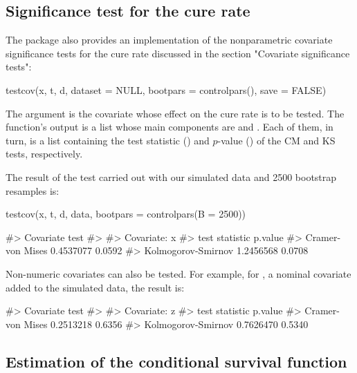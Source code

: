 \subsection{Significance test for the cure rate} \label{sec:sig_test}

The  package also provides an implementation of the nonparametric covariate significance tests for the cure rate discussed in the section "Covariate significance tests":

\begin{example}
testcov(x, t, d, dataset = NULL, bootpars = controlpars(), save = FALSE)
\end{example}

The  argument is the covariate whose effect on the cure rate is to be tested. The function's output is a list whose main components are  and . Each of them, in turn, is a list containing the test statistic () and $p$-value () of the CM and KS tests, respectively.

The result of the test carried out with our simulated data and 2500 bootstrap resamples is:

\begin{example}
testcov(x, t, d, data, bootpars = controlpars(B = 2500))
\end{example}
\begin{example}
#> Covariate test 
#>
#> Covariate:  x 
#>               test statistic p.value
#>   Cramer-von Mises 0.4537077  0.0592
#> Kolmogorov-Smirnov 1.2456568  0.0708
\end{example}

Non-numeric covariates can also be tested. For example, for , a nominal covariate added to the simulated data, the result is:

\begin{example}
#> Covariate test 
#>
#> Covariate:  z 
#>               test statistic p.value
#>   Cramer-von Mises 0.2513218  0.6356
#> Kolmogorov-Smirnov 0.7626470  0.5340
\end{example}

\subsection{Estimation of the conditional survival function} \label{sec:survival estimation}

